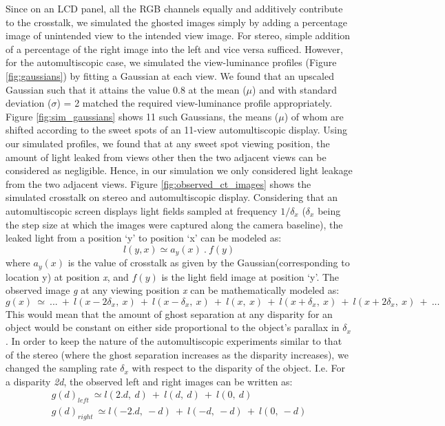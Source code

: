 Since on an LCD panel, all the RGB channels equally and additively contribute to the crosstalk, we simulated the ghosted images simply by adding a percentage image of unintended view to the intended view image. For stereo, simple addition of a percentage of the right image into the left and vice versa sufficed. However, for the automultiscopic case, we simulated the view-luminance profiles (Figure \ref{fig:gaussians}) by fitting a Gaussian at each view. We found that an upscaled Gaussian such that it attains the value 0.8 at the mean ($\mu$) and with standard deviation ($\sigma$) = 2 matched the required view-luminance profile appropriately. Figure \ref{fig:sim_gaussians} shows 11 such Gaussians, the means ($\mu$) of whom are shifted according to the sweet spots of an 11-view automultiscopic display. Using our simulated profiles, we found that at any sweet spot viewing position, the amount of light leaked from views other then the two adjacent views can be considered as negligible. Hence, in our simulation we only considered light leakage from the two adjacent views. Figure \ref{fig:observed_ct_images} shows the simulated crosstalk on stereo and automultiscopic display. Considering that an automultiscopic screen displays light fields sampled at frequency $1/\delta_x$ ($\delta_x$ being the step size at which the images were captured along the camera baseline), the leaked light from a position `y' to position `x' can be modeled as:
\begin{equation}
l(y,x) \simeq a_y(x)\:.\:f(y)
\label{eq:ct_leak_eq}
\end{equation}
where $a_y(x)$ is the value of crosstalk as given by the Gaussian(corresponding to location y) at position \emph{x}, and $f(y)$ is the light field image at position `y'. The observed image \emph{g} at any viewing position \emph{x} can be mathematically modeled as:
\begin{equation}
g(x) \: \simeq \: ...\: +\: l(x-2\delta_x,\:x)\:+\: l(x-\delta_x,\:x)\:+\:l(x,\:x)\:+\: l(x+\delta_x,\:x)\:+\: l(x+2\delta_x,\:x)\:+ \:...
\label{eq:ct_sim_eq}
\end{equation}
This would mean that the amount of ghost separation at any disparity for an object would be constant on either side proportional to the object's parallax in $\delta_x$. In order to keep the nature of the automultiscopic experiments similar to that of the stereo (where the ghost separation increases as the disparity increases), we changed the sampling rate $\delta_x$ with respect to the disparity of the object. I.e. For a disparity \emph{2d}, the observed left and right images can be written as:
\begin{equation}
\begin{aligned}
g(d)_{left} \: \simeq l(2.d,\:d)\:+\: l(d,\:d)\:+\:l(0,\:d) \\
g(d)_{right} \: \simeq l(-2.d,\:-d)\:+\: l(-d,\:-d)\:+\:l(0,\:-d)
\end{aligned}
\label{eq:auto_obs_imgs}
\end{equation}

